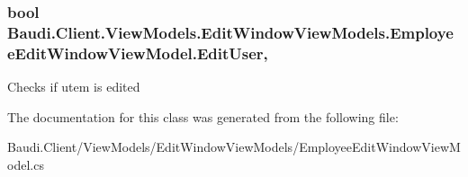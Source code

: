 \subsubsection[{Edit\+User}]{\setlength{\rightskip}{0pt plus 5cm}bool Baudi.\+Client.\+View\+Models.\+Edit\+Window\+View\+Models.\+Employee\+Edit\+Window\+View\+Model.\+Edit\+User\hspace{0.3cm}{\ttfamily [get]}, {\ttfamily [set]}}\label{class_baudi_1_1_client_1_1_view_models_1_1_edit_window_view_models_1_1_employee_edit_window_view_model_a9eab1b3c166b70aaf85246cb46b64d2e}


Checks if utem is edited 



The documentation for this class was generated from the following file\+:\begin{DoxyCompactItemize}
\item 
Baudi.\+Client/\+View\+Models/\+Edit\+Window\+View\+Models/Employee\+Edit\+Window\+View\+Model.\+cs\end{DoxyCompactItemize}
